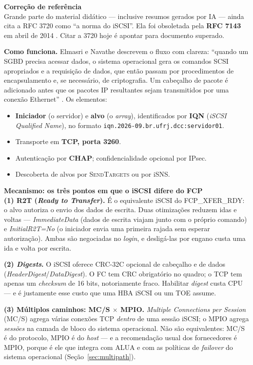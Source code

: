 \documentclass[11pt,a4paper]{article}
\newcommand{\destaque}[2]{%
  \begin{center}\begin{minipage}{0.96\textwidth}
  \colorbox{fundo}{\begin{minipage}{\dimexpr\linewidth-2\fboxsep}
  \vspace{2pt}\textbf{\color{azul}\small #1}\\[1pt]\footnotesize #2\vspace{3pt}
  \end{minipage}}\end{minipage}\end{center}}
\newcommand{\correcao}[2]{%
  \begin{center}\begin{minipage}{0.96\textwidth}
  \colorbox{fundo}{\begin{minipage}{\dimexpr\linewidth-2\fboxsep}
  \vspace{2pt}\textbf{\color{laranja}\small #1}\\[1pt]\footnotesize #2\vspace{3pt}
  \end{minipage}}\end{minipage}\end{center}}
\begin{document}
\correcao{Correção de referência}{%
Grande parte do material didático --- inclusive resumos gerados por IA --- ainda cita a RFC 3720
como ``a norma do iSCSI''. Ela foi obsoletada pela \textbf{RFC 7143} em abril de 2014
\cite{rfc7143}. Citar a 3720 hoje é apontar para documento superado.}

\textbf{Como funciona.} Elmasri e Navathe descrevem o fluxo com clareza: ``quando um SGBD precisa
acessar dados, o sistema operacional gera os comandos SCSI apropriados e a requisição de dados, que
então passam por procedimentos de encapsulamento e, se necessário, de criptografia. Um cabeçalho de
pacote é adicionado antes que os pacotes IP resultantes sejam transmitidos por uma conexão
Ethernet'' \cite{elmasri2018}. Os elementos:

\begin{itemize}[leftmargin=0.7cm,itemsep=2pt]
\item \textbf{Iniciador} (o servidor) e \textbf{alvo} (o \textit{array}), identificados por
      \textbf{IQN} (\textit{iSCSI Qualified Name}), no formato
      \texttt{iqn.2026-09.br.ufrj.dcc:servidor01}.
\item Transporte em \textbf{TCP, porta 3260}.
\item Autenticação por \textbf{CHAP}; confidencialidade opcional por IPsec.
\item Descoberta de alvos por \textsc{SendTargets} ou por iSNS.
\end{itemize}

\destaque{Mecanismo: os três pontos em que o iSCSI difere do FCP}{%
\textbf{(1) R2T (\textit{Ready to Transfer}).} É o equivalente iSCSI do \textsf{FCP\_XFER\_RDY}: o
alvo autoriza o envio dos dados de escrita. Duas otimizações reduzem idas e voltas ---
\textit{ImmediateData} (dados de escrita viajam junto com o próprio comando) e
\textit{InitialR2T=No} (o iniciador envia uma primeira rajada sem esperar autorização). Ambas são
negociadas no \textit{login}, e desligá-las por engano custa uma ida e volta por escrita.

\smallskip
\textbf{(2) \textit{Digests}.} O iSCSI oferece CRC-32C opcional de cabeçalho e de dados
(\textit{HeaderDigest}/\textit{DataDigest}). O FC tem CRC obrigatório no quadro; o TCP tem apenas um
\textit{checksum} de 16 bits, notoriamente fraco. Habilitar \textit{digest} custa CPU --- e é
justamente esse custo que uma HBA iSCSI ou um TOE assume.

\smallskip
\textbf{(3) Múltiplos caminhos: MC/S $\times$ MPIO.} \textit{Multiple Connections per Session}
(MC/S) agrega várias conexões TCP \emph{dentro} de uma sessão iSCSI; o MPIO agrega \emph{sessões} na
camada de bloco do sistema operacional. Não são equivalentes: MC/S é do protocolo, MPIO é do
\textit{host} --- e a recomendação usual dos fornecedores é MPIO, porque é ele que integra com ALUA
e com as políticas de \textit{failover} do sistema operacional (Seção~\ref{sec:multipath}).}
\end{document}
